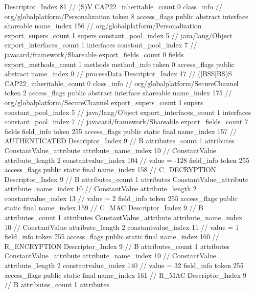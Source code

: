 {{{{{					Descriptor_Index	81		// (S)V
				}
			}
			CAP22_inheritable_count	0
		}
		class_info {		// org/globalplatform/Personalization
			token	8
			access_flags	public abstract interface shareable
			name_index	156		// org/globalplatform/Personalization
			export_supers_count	1
			supers {
				constant_pool_index	5		// java/lang/Object
			}
			export_interfaces_count	1
			interfaces {
				constant_pool_index	7		// javacard/framework/Shareable
			}
			export_fields_count	0
			fields {
			}
			export_methods_count	1
			methods {
				method_info {
					token	0
					access_flags	public abstract
					name_index	0		// processData
					Descriptor_Index	17		// ([BSS[BS)S
				}
			}
			CAP22_inheritable_count	0
		}
		class_info {		// org/globalplatform/SecureChannel
			token	2
			access_flags	public abstract interface shareable
			name_index	175		// org/globalplatform/SecureChannel
			export_supers_count	1
			supers {
				constant_pool_index	5		// java/lang/Object
			}
			export_interfaces_count	1
			interfaces {
				constant_pool_index	7		// javacard/framework/Shareable
			}
			export_fields_count	7
			fields {
			field_info {
				token	255
				access_flags	public static final
				name_index	157		// AUTHENTICATED
				Descriptor_Index	9		// B
				attributes_count	1
				attributes {
				ConstantValue_attribute {
					attribute_name_index	10		// ConstantValue
					attribute_length	2
					constantvalue_index	104		// value = -128
				}
				}
			}
			field_info {
				token	255
				access_flags	public static final
				name_index	158		// C_DECRYPTION
				Descriptor_Index	9		// B
				attributes_count	1
				attributes {
				ConstantValue_attribute {
					attribute_name_index	10		// ConstantValue
					attribute_length	2
					constantvalue_index	13		// value = 2
				}
				}
			}
			field_info {
				token	255
				access_flags	public static final
				name_index	159		// C_MAC
				Descriptor_Index	9		// B
				attributes_count	1
				attributes {
				ConstantValue_attribute {
					attribute_name_index	10		// ConstantValue
					attribute_length	2
					constantvalue_index	11		// value = 1
				}
				}
			}
			field_info {
				token	255
				access_flags	public static final
				name_index	160		// R_ENCRYPTION
				Descriptor_Index	9		// B
				attributes_count	1
				attributes {
				ConstantValue_attribute {
					attribute_name_index	10		// ConstantValue
					attribute_length	2
					constantvalue_index	140		// value = 32
				}
				}
			}
			field_info {
				token	255
				access_flags	public static final
				name_index	161		// R_MAC
				Descriptor_Index	9		// B
				attributes_count	1
				attributes {
}}}}}}
